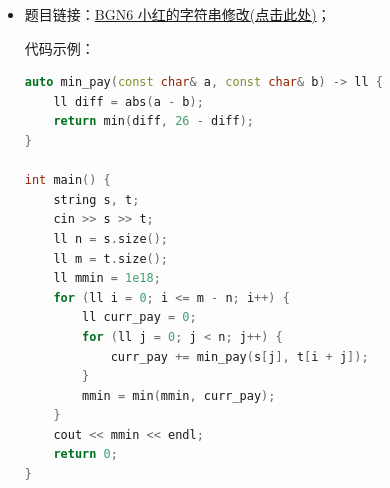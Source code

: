\begin{itemize}
\textcolor{red}{根据上述推导，最大距离即为:}
\begin{equation}
	\max_{i,j} d(i, j) = \max \left( \max_i(x_i + y_i) - \min_j(x_j + y_j), \max_i(x_i - y_i) - \min_j(x_j - y_j) \right)
\end{equation}
代码示例：\\
\begin{lstlisting}[language=C++]
int main() {
	ios::sync_with_stdio(false);
	cin.tie(nullptr);
	
	int n;
	if (!(cin >> n)) return 0;
	
	// 初始化极值为极大/极小值
	ll s_max = -4e18, s_min = 4e18; // 4e18 是为了防止 10^9 平方后溢出
	ll d_max = -4e18, d_min = 4e18;
	
	for (ll i = 1; i <= n; i++) {
		ll a;
		cin >> a;
		
		ll x = i * i;
		ll y = a * a;
		
		// 计算当前点的 x+y 和 x-y
		ll current_s = x + y;
		ll current_d = x - y;
		
		// 更新四个极值
		s_max = max(s_max, current_s);
		s_min = min(s_min, current_s);
		d_max = max(d_max, current_d);
		d_min = min(d_min, current_d);
	}
	
	// 曼哈顿距离最大值的经典公式
	ll ans = max(s_max - s_min, d_max - d_min);
	cout << ans << endl;
	
	return 0;
}
\end{lstlisting}
\subsubsection{字符串移动的处理}
\item 题目链接：\href{https://www.nowcoder.com/practice/66e0054ff6b345afa47bcd4e8ceb72d7?tpId=385&tqId=11183285&sourceUrl=%2Fexam%2Foj%3FquestionJobId%3D10%26subTabName%3Donline_coding_page}{BGN6 小红的字符串修改(点击此处)}；

代码示例：\\
\begin{lstlisting}[language=C++]
auto min_pay(const char& a, const char& b) -> ll {
	ll diff = abs(a - b);
	return min(diff, 26 - diff);
}

int main() {
	string s, t;
	cin >> s >> t;
	ll n = s.size();
	ll m = t.size();
	ll mmin = 1e18;
	for (ll i = 0; i <= m - n; i++) {
		ll curr_pay = 0;
		for (ll j = 0; j < n; j++) {
			curr_pay += min_pay(s[j], t[i + j]);
		}
		mmin = min(mmin, curr_pay);
	}
	cout << mmin << endl;
	return 0;
}
\end{lstlisting}


\end{itemize}
